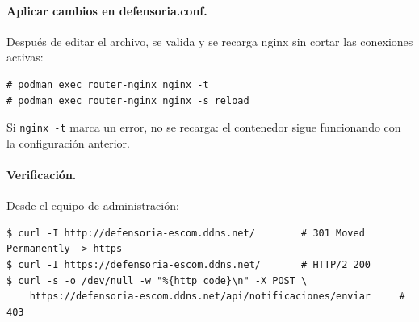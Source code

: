 \paragraph{Aplicar cambios en defensoria.conf.} Después de editar el archivo, se valida y se recarga nginx sin cortar las conexiones activas:
\begin{lstlisting}
# podman exec router-nginx nginx -t
# podman exec router-nginx nginx -s reload
\end{lstlisting}
Si \texttt{nginx -t} marca un error, no se recarga: el contenedor sigue funcionando con la configuración anterior.

\paragraph{Verificación.} Desde el equipo de administración:
\begin{lstlisting}
$ curl -I http://defensoria-escom.ddns.net/        # 301 Moved Permanently -> https
$ curl -I https://defensoria-escom.ddns.net/       # HTTP/2 200
$ curl -s -o /dev/null -w "%{http_code}\n" -X POST \
    https://defensoria-escom.ddns.net/api/notificaciones/enviar     # 403
\end{lstlisting}
